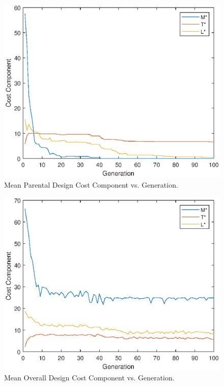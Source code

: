 \documentclass[a4paper,12pt]{report}
\begin{document}
\begin{figure}[H]
  \includegraphics[width=\linewidth]{results2b.eps}
  \caption{Mean Parental Design Cost Component vs. Generation.}
\end{figure}

\begin{figure}[H]
  \includegraphics[width=\linewidth]{results2c.eps}
  \caption{Mean Overall Design Cost Component vs. Generation.}
\end{figure}
\end{document}
